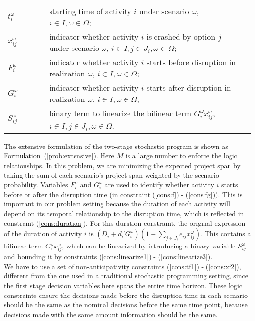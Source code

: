 \documentclass[11pt]{article}
\newcommand{\noi}{\noindent}
\begin{document}
\begin{table}[H]
\begin{tabular}{ l l l l }
			\(t_{i}^\omega\) & \(\qquad\) & starting time of activity \(i\) under scenario \(\omega\), \(i \in I, \omega \in \Omega\);&\\
			\(x_{ij}^\omega\) & \(\qquad\) & indicator whether activity \(i\) is crashed by option \(j\) under scenario \(\omega\), \(i \in I, j \in J_i, \omega \in \Omega \); &\\
			\(F_i^\omega\) & \(\qquad\) & indicator whether activity \(i\) starts before disruption in realization \(\omega\), \(i \in I, \omega \in \Omega\);&\\
			\(G_i^\omega\) & \(\qquad\) & indicator whether activity \(i\) starts after disruption in realization \(\omega\), \(i \in I, \omega \in \Omega\);&\\
			\(S_{ij}^\omega\) & \(\qquad\) & binary term to linearize the bilinear term \(G_i^\omega x_{ij}^\omega\), \(i \in I, j \in J_{i}, \omega \in \Omega\).&\\
		\end{tabular}
	\end{table}
	\noi The extensive formulation of the two-stage stochastic program is shown as Formulation~(\ref{prob:extensive}). Here \(M\) is a large number to enforce the logic relationships. In this problem, we are minimizing the expected project span by taking the sum of each scenario's project span weighted by the scenario probability. Variables \(F^\omega_i\) and \(G^\omega_i\) are used to identify whether activity \(i\) starts before or after the disruption time (in constraint (\ref{cons:f}) - (\ref{cons:fg})). This is important in our problem setting because the duration of each activity will depend on its temporal relationship to the disruption time, which is reflected in constraint (\ref{cons:duration}). For this duration constraint, the original expression of the duration of activity \(i\) is \((D_i + d_i^\omega G_i^\omega)(1 - \sum_{j \in J_i} e_{ij}x_{ij}^\omega)\). This contains a bilinear term \(G_i^\omega x_{ij}^\omega\), which can be linearized by introducing a binary variable \(S_{ij}^\omega\) and bounding it by constraints (\ref{cons:linearize1}) - (\ref{cons:linearize3}).\\
	\newline
	We have to use a set of non-anticipativity constraints (\ref{cons:tf1}) - (\ref{cons:xf2}), different from the one used in a traditional stochastic programming setting, since the first stage decision variables here spans the entire time horizon. These logic constraints ensure the decisions made before the disruption time in each scenario should be the same as the nominal decisions before the same time point, because decisions made with the same amount information should be the same.\\
\end{document}
